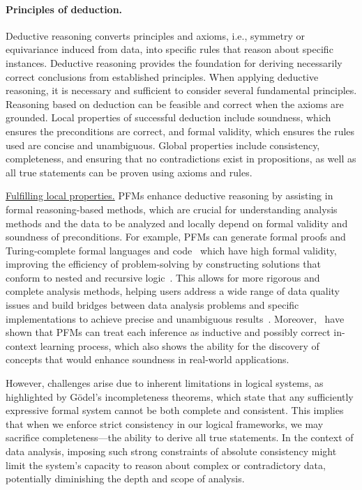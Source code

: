   
  \paragraph{Principles of deduction.} Deductive reasoning converts principles and axioms, i.e., symmetry or equivariance induced from data, into specific rules that reason about specific instances. Deductive reasoning provides the foundation for deriving necessarily correct conclusions from established principles. When applying deductive reasoning, it is necessary and sufficient to consider several fundamental principles. Reasoning based on deduction can be feasible and correct when the axioms are grounded. Local properties of successful deduction include soundness, which ensures the preconditions are correct, and formal validity, which ensures the rules used are concise and unambiguous. Global properties include consistency, completeness, and ensuring that no contradictions exist in propositions, as well as all true statements can be proven using axioms and rules.
  
  \underline{Fulfilling local properties.} PFMs enhance deductive reasoning by assisting in formal reasoning-based methods, which are crucial for understanding analysis methods and the data to be analyzed and locally depend on formal validity and soundness of preconditions. For example, PFMs can generate formal proofs and Turing-complete formal languages and code~\cite{Li2024IsPB} which have high formal validity, improving the efficiency of problem-solving by constructing solutions that conform to nested and recursive logic~\cite{Khakhar2023PACPS}. This allows for more rigorous and complete analysis methods, helping users address a wide range of data quality issues and build bridges between data analysis problems and specific implementations to achieve precise and unambiguous results~\cite{qi2024cleanagent}. Moreover,~\cite {Li2024IsPB} have shown that PFMs can treat each inference as inductive and possibly correct in-context learning process, which also shows the ability for the discovery of concepts that would enhance soundness in real-world applications.
  
  However, challenges arise due to inherent limitations in logical systems, as highlighted by Gödel's incompleteness theorems, which state that any sufficiently expressive formal system cannot be both complete and consistent. This implies that when we enforce strict consistency in our logical frameworks, we may sacrifice completeness—the ability to derive all true statements. In the context of data analysis, imposing such strong constraints of absolute consistency might limit the system's capacity to reason about complex or contradictory data, potentially diminishing the depth and scope of analysis.
  

